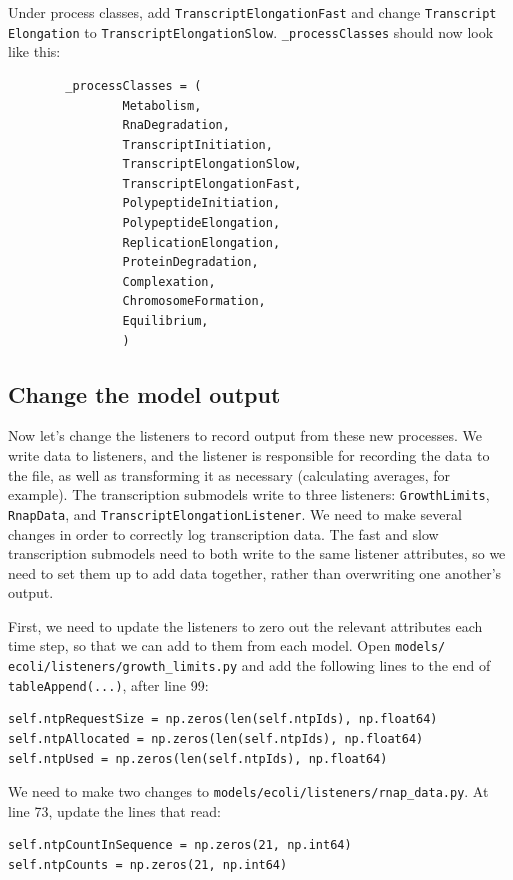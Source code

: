 \documentclass[12pt]{article}
\begin{document}
Under process classes, add \texttt{TranscriptElongationFast} and change \texttt{Transcript \allowbreak Elongation} to \texttt{TranscriptElongationSlow}. \texttt{\_processClasses} should now look like this:


\begin{lstlisting}
        _processClasses = (
                Metabolism,
                RnaDegradation,
                TranscriptInitiation,
                TranscriptElongationSlow,
                TranscriptElongationFast,
                PolypeptideInitiation,
                PolypeptideElongation,
                ReplicationElongation,
                ProteinDegradation,
                Complexation,
                ChromosomeFormation,
                Equilibrium,
                )
\end{lstlisting}

\subsection{Change the model output}

Now let's change the listeners to record output from these new processes. We write data to listeners, and the listener is responsible for recording the data to the file, as well as transforming it as necessary (calculating averages, for example). The transcription submodels write to three listeners: \texttt{GrowthLimits}, \texttt{RnapData}, and \texttt{TranscriptElongationListener}. We need to make several changes in order to correctly log transcription data. The fast and slow transcription submodels need to both write to the same listener attributes, so we need to set them up to add data together, rather than overwriting one another's output.

First, we need to update the listeners to zero out the relevant attributes each time step, so that we can add to them from each model. Open \texttt{models/ \allowbreak ecoli/listeners/growth\_limits.py} and add the following lines to the end of \texttt{tableAppend(...)}, after line 99:

\lstset{language=Python}
\begin{lstlisting}
self.ntpRequestSize = np.zeros(len(self.ntpIds), np.float64)
self.ntpAllocated = np.zeros(len(self.ntpIds), np.float64)
self.ntpUsed = np.zeros(len(self.ntpIds), np.float64)
\end{lstlisting}

We need to make two changes to \texttt{models/ecoli/listeners/rnap\_data.py}. At line 73, update the lines that read:
\lstset{language=Python}
\begin{lstlisting}
self.ntpCountInSequence = np.zeros(21, np.int64)
self.ntpCounts = np.zeros(21, np.int64)
\end{lstlisting}
\end{document}
